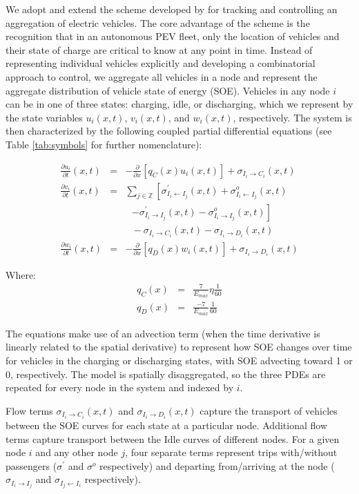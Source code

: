 \documentclass[journal]{IEEEtran}
\begin{document}
We adopt and extend the scheme developed by \cite{lefloch_pde_2016} for tracking and controlling an aggregation of electric vehicles. The core advantage of the scheme is the recognition that in an autonomous PEV fleet, only the location of vehicles and their state of charge are critical to know at any point in time. Instead of representing individual vehicles explicitly and developing a combinatorial approach to control, we aggregate all vehicles in a node and represent the aggregate distribution of vehicle state of energy (SOE). Vehicles in any node $i$ can be in one of three states: charging, idle, or discharging, which we represent by the state variables $u_i(x,t)$, $v_i(x,t)$, and $w_i(x,t)$, respectively. The system is then characterized by the following coupled partial differential equations (see Table \ref{tab:symbols} for further nomenclature):

\begin{eqnarray*}
    \frac{\partial u_i}{\partial t}(x,t) &=& -\frac{\partial}{\partial x}\left[ q_C(x) u_i(x,t) \right] + \sigma_{I_i \rightarrow C_i}(x,t) \\
    \frac{\partial v_i}{\partial t}(x,t) &=& \sum_{j\in\mathbb{Z}} \left[ \sigma_{I_i \leftarrow I_j}^\prime(x,t) + \sigma_{I_i \leftarrow I_j}^o(x,t) \right. \\
    & & ~~~ \left. - \sigma_{I_i \rightarrow I_j}^\prime(x,t) - \sigma_{I_i \rightarrow I_j}^o(x,t) \right] \\
    && ~~~ - \sigma_{I_i \rightarrow C_i}(x,t) - \sigma_{I_i \rightarrow D_i}(x,t) \\
    \frac{\partial w_i}{\partial t}(x,t) &=& -\frac{\partial}{\partial x}\left[ q_D(x) w_i(x,t) \right] + \sigma_{I_i \rightarrow D_i}(x,t) 
\end{eqnarray*}

Where: 
\begin{eqnarray*}
q_C(x) &=& \frac{7}{E_{max}}\eta\frac{1}{60} \\
q_D(x) &=& \frac{-7}{E_{max}}\frac{1}{60}
\end{eqnarray*}

The equations make use of an advection term (when the time derivative is linearly related to the spatial derivative) to represent how SOE changes over time for vehicles in the charging or discharging states, with SOE advecting toward 1 or 0, respectively. The model is spatially disaggregated, so the three PDEs are repeated for every node in the system and indexed by $i$.

Flow terms $\sigma_{I_i \rightarrow C_i}(x,t)$ and $\sigma_{I_i \rightarrow D_i}(x,t)$ capture the transport of vehicles between the SOE curves for each state at a particular node. Additional flow terms capture transport between the Idle curves of different nodes. For a given node $i$ and any other node $j$, four separate terms represent trips with/without passengers ($\sigma^\prime$ and $\sigma^o$ respectively) and departing from/arriving at the node ($\sigma_{I_i \rightarrow I_j}$ and $\sigma_{I_j \leftarrow I_i}$ respectively).
\end{document}
